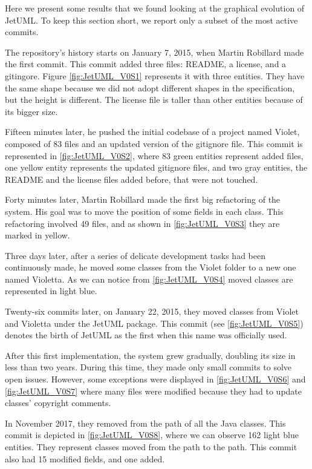 Here we present some results that we found looking at the graphical evolution of JetUML. 
To keep this section short, we report only a subset of the most active commits. 

The repository's history starts on January 7, 2015, when Martin Robillard made the first commit. 
This commit added three files: README, a license, and a gitingore. 
Figure \ref{fig:JetUML_V0S1} represents it with three entities. They have the same shape because we did not adopt different shapes in the specification, but the height is different. The license file is taller than other entities because of its bigger size. 

Fifteen minutes later, he pushed the initial codebase of a project named Violet, composed of 83 files and an updated version of the gitignore file. This commit is represented in \autoref{fig:JetUML_V0S2}, where 83 green entities represent added files, one yellow entity represents the updated gitignore files, and two gray entities, the README and the license files added before, that were not touched.

Forty minutes later, Martin Robillard made the first big refactoring of the system. His goal was to move the position of some fields in each class. This refactoring involved 49 files, and as shown in \autoref{fig:JetUML_V0S3} they are marked in yellow. 

Three days later, after a series of delicate development tasks had been continuously made, he moved some classes from the Violet folder to a new one named Violetta. As we can notice from \autoref{fig:JetUML_V0S4} moved classes are represented in light blue. 

Twenty-six commits later, on January 22, 2015, they moved classes from Violet and Violetta under the JetUML package. 
This commit (see \autoref{fig:JetUML_V0S5}) denotes the birth of JetUML as the first when this name was officially used.

After this first implementation, the system grew gradually, doubling its size in less than two years. 
During this time, they made only small commits to solve open issues. However, some exceptions were displayed in \autoref{fig:JetUML_V0S6} and \autoref{fig:JetUML_V0S7} where many files were modified because they had to update classes' copyright comments. 

In November 2017, they removed  from the path of all the Java classes. This commit is depicted in \autoref{fig:JetUML_V0S8}, where we can observe 162 light blue entities. They represent classes moved from the  path to the 
 path. This commit also had 15 modified fields, and one added. 


